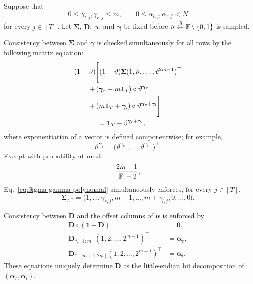 \begin{lemma}
\label{lemma:shape-derived-consistency}
Suppose that
\[
    0\le\gamma_{l,j},\gamma_{r,j}\le m,
    \qquad
    0\le\alpha_{l,j},\alpha_{r,j}<N
\]
for every $j\in[T]$.  Let
$\bm\Sigma$, $\bm D$, $\bm\alpha$, and $\bm\gamma$ be fixed before
$\vartheta\mathrel{\xleftarrow{\$}}{\mathbb{F}}\setminus\{0,1\}$ is sampled.

Consistency between $\bm\Sigma$ and $\bm\gamma$ is checked simultaneously
for all rows by the following matrix equation:
\begin{equation}
\label{eq:Sigma-gamma-polynomial}
\begin{aligned}
&(1-\vartheta)
\Bigg[
(1-\vartheta)\bm\Sigma
(1,\vartheta,\ldots,\vartheta^{2m-1})^\top\\
&\qquad
+(\bm\gamma_r-m\bm1_T)
    \circ\vartheta^{\bm\gamma_r}\\
&\qquad
+(m\bm1_T+\bm\gamma_l)
    \circ\vartheta^{\bm\gamma_r+\bm\gamma_l}
\Bigg]\\
&\hspace{12mm}
=
\bm1_T-\vartheta^{\bm\gamma_r+\bm\gamma_l},
\end{aligned}
\end{equation}
where exponentiation of a vector is defined componentwise; for example,
\[
\vartheta^{\bm\gamma_r}
=
\bigl(
\vartheta^{\gamma_{r,1}},
\ldots,
\vartheta^{\gamma_{r,T}}
\bigr)^\top.
\]
Except with probability at most
\[
    \frac{2m-1}{|{\mathbb{F}}|-2},
\]
Eq.~\eqref{eq:Sigma-gamma-polynomial} simultaneously enforces, for every
$j\in[T]$,
\[
\bm\Sigma_{j,*}
=
\bigl(
1,\ldots,\gamma_{r,j},
m+1,\ldots,m+\gamma_{l,j},
0,\ldots,0
\bigr).
\]

Consistency between $\bm D$ and the offset columns of $\bm\alpha$ is
enforced by
\begin{equation}
\label{eq:D-alpha-consistency}
\begin{aligned}
    \bm D\circ(\bm1-\bm D)
    &=\bm0,\\
    \bm D_{*,[1:m]}
    (1,2,\ldots,2^{m-1})^\top
    &=\bm\alpha_r,\\
    \bm D_{*,[m+1:2m]}
    (1,2,\ldots,2^{m-1})^\top
    &=\bm\alpha_l.
\end{aligned}
\end{equation}
These equations uniquely determine $\bm D$ as the little-endian bit
decomposition of $(\bm\alpha_r,\bm\alpha_l)$.
\end{lemma}

